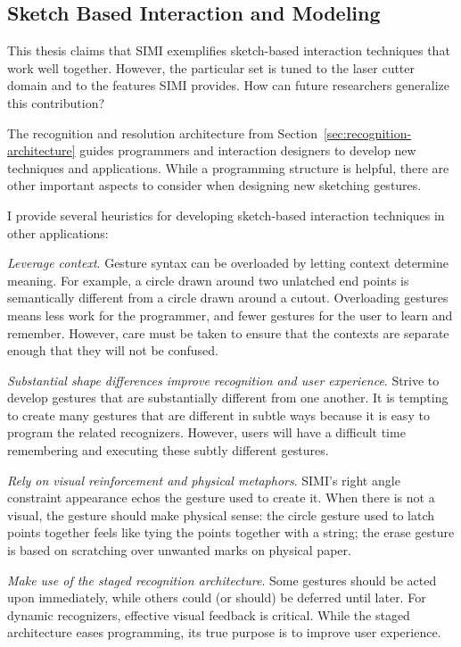 \subsection{Sketch Based Interaction and Modeling}

This thesis claims that SIMI exemplifies sketch-based interaction
techniques that work well together. However, the particular set is
tuned to the laser cutter domain and to the features SIMI
provides. How can future researchers generalize this contribution?

The recognition and resolution architecture from
Section~\ref{sec:recognition-architecture} guides programmers and
interaction designers to develop new techniques and
applications. While a programming structure is helpful, there are
other important aspects to consider when designing new sketching
gestures.

I provide several heuristics for developing sketch-based interaction
techniques in other applications:

\textit{Leverage context}. Gesture syntax can be overloaded by letting
context determine meaning. For example, a circle drawn around two
unlatched end points is semantically different from a circle drawn
around a cutout. Overloading gestures means less work for the
programmer, and fewer gestures for the user to learn and
remember. However, care must be taken to ensure that the contexts are
separate enough that they will not be confused.

\textit{Substantial shape differences improve recognition and user
  experience}. Strive to develop gestures that are substantially
different from one another. It is tempting to create many gestures
that are different in subtle ways because it is easy to program the
related recognizers. However, users will have a difficult time
remembering and executing these subtly different gestures.

\textit{Rely on visual reinforcement and physical metaphors}. SIMI's
right angle constraint appearance echos the gesture used to create
it. When there is not a visual, the gesture should make physical
sense: the circle gesture used to latch points together feels like
tying the points together with a string; the erase gesture is based on
scratching over unwanted marks on physical paper.

\textit{Make use of the staged recognition architecture}. Some
gestures should be acted upon immediately, while others could (or
should) be deferred until later. For dynamic recognizers, effective
visual feedback is critical. While the staged architecture eases
programming, its true purpose is to improve user experience.

